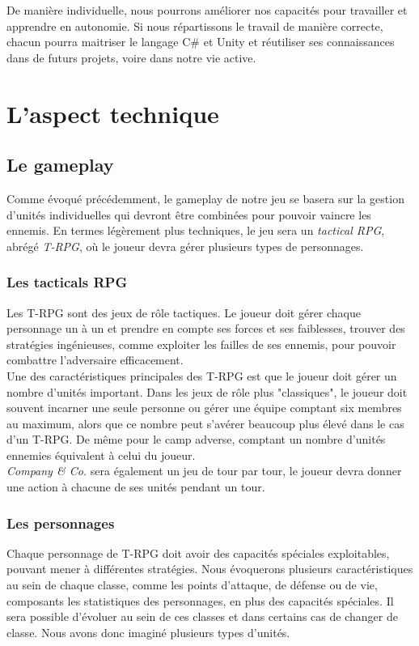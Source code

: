 \documentclass{article}
\begin{document}
De manière individuelle, nous pourrons améliorer nos capacités pour travailler et apprendre en autonomie. Si nous répartissons le travail de manière correcte, chacun pourra maitriser le langage C\# et Unity et réutiliser ses connaissances dans de futurs projets, voire dans notre vie active.

\section{L'aspect technique}
\subsection{Le gameplay}
Comme évoqué précédemment, le gameplay de notre jeu se basera sur la gestion d'unités individuelles qui devront être combinées pour pouvoir vaincre les ennemis. En termes légèrement plus techniques, le jeu sera un \textit{tactical RPG}, abrégé \textit{T-RPG}, où le joueur devra gérer plusieurs types de personnages.

\subsubsection{Les tacticals RPG}
Les T-RPG sont des jeux de rôle tactiques. Le joueur doit gérer chaque personnage un à un et prendre en compte ses forces et ses faiblesses, trouver des stratégies ingénieuses, comme exploiter les failles de ses ennemis, pour pouvoir combattre l'adversaire efficacement.\\

Une des caractéristiques principales des T-RPG est que le joueur doit gérer un nombre d'unités important. Dans les jeux de rôle plus "classiques", le joueur doit souvent incarner une seule personne ou gérer une équipe comptant six membres au maximum, alors que ce nombre peut s'avérer beaucoup plus élevé dans le cas d'un T-RPG. De même pour le camp adverse, comptant un nombre d'unités ennemies équivalent à celui du joueur.\\

\textit{Company \& Co.} sera également un jeu de tour par tour, le joueur devra donner une action à chacune de ses unités pendant un tour.

\subsubsection{Les personnages}
Chaque personnage de T-RPG doit avoir des capacités spéciales exploitables, pouvant mener à différentes stratégies. Nous évoquerons plusieurs caractéristiques au sein de chaque classe, comme les points d'attaque, de défense ou de vie, composants les statistiques des personnages, en plus des capacités spéciales. Il sera possible d'évoluer au sein de ces classes et dans certains cas de changer de classe. Nous avons donc imaginé plusieurs types d'unités.\\
\end{document}
